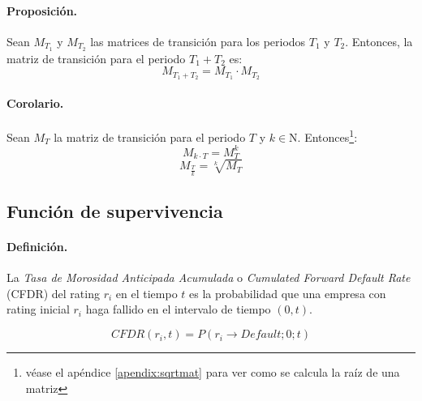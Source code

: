 \paragraph{Proposici\'on.} Sean $M_{T_1}$ y $M_{T_2}$ las matrices de transici\'on
para los periodos $T_1$ y $T_2$. Entonces, la matriz de transici\'on para el
periodo $T_1+T_2$ es:
\begin{equation}
M_{T_1+T_2} = M_{T_1} \cdot M_{T_2}
\end{equation}

\paragraph{Corolario.} Sean $M_{T}$ la matriz de transici\'on para el periodo 
$T$ y $k \in \mathrm{N}$. Entonces\footnote{v\'ease el ap\'endice \ref{apendix:sqrtmat} 
para ver como se calcula la ra\'iz de una matriz}:
\begin{equation}
M_{k \cdot T} = M_{T}^k
\end{equation}
\begin{equation}
M_{\frac{T}{k}} = \sqrt[k]{M_{T}}
\end{equation}


\subsection{Funci\'on de supervivencia}
\label{mtrans:survival}

\paragraph{Definici\'on.} La \emph{Tasa de Morosidad Anticipada Acumulada}
o \emph{Cumulated Forward Default Rate} (CFDR)
del rating $r_i$ en el tiempo $t$ es la probabilidad que una empresa con rating inicial
$r_i$ haga fallido en el intervalo de tiempo $(0,t)$.

\begin{equation}
CFDR(r_i,t)=P(r_i \to Default;0;t)
\end{equation}

